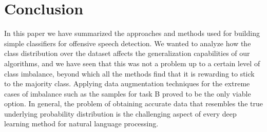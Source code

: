 \documentclass[11pt,a4paper]{article}
\begin{document}
\section{Conclusion}

In this paper we have summarized the approaches and methods used for building simple classifiers for offensive speech detection. We wanted to analyze how the class distribution over the dataset affects the generalization capabilities of our algorithms, and we have seen that this was not a problem up to a certain level of class imbalance, beyond which all the methods find that it is rewarding to stick to the majority class. Applying data augmentation techniques for the extreme cases of imbalance such as the samples for task B proved to be the only viable option. In general, the problem of obtaining accurate data that resembles the true underlying probability distribution is the challenging aspect of every deep learning method for natural language processing. 



\end{document}
